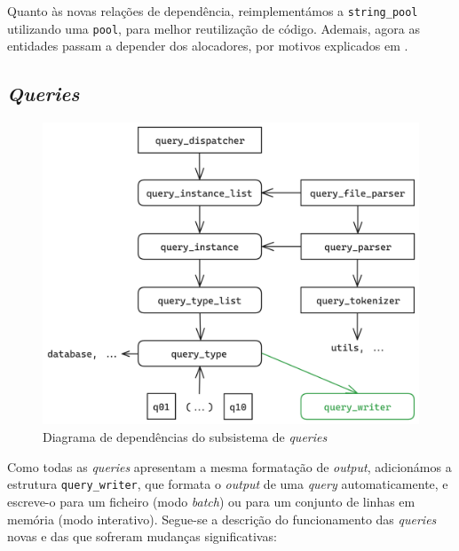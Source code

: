 \documentclass[12pt, a4paper]{article}
\begin{document}
Quanto às novas relações de dependência, reimplementámos a \texttt{string\_pool} utilizando uma
\texttt{pool}, para melhor reutilização de código. Ademais, agora as entidades passam a depender
dos alocadores, por motivos explicados em .

\subsection{\emph{Queries}}
\label{sec:queries}

\begin{figure}[ht]
    \centering
    \includegraphics[scale=0.17]{res-fase2/queries.png}
    \caption{Diagrama de dependências do subsistema de \emph{queries}}
    \label{fig:queries}
\end{figure}

Como todas as \emph{queries} apresentam a mesma formatação de \emph{output}, adicionámos a estrutura
\texttt{query\_writer}, que formata o \emph{output} de uma \emph{query} automaticamente, e escreve-o
para um ficheiro (modo \emph{batch}) ou para um conjunto de linhas em memória (modo interativo).
Segue-se a descrição do funcionamento das \emph{queries} novas e das que sofreram mudanças
significativas:
\end{document}
